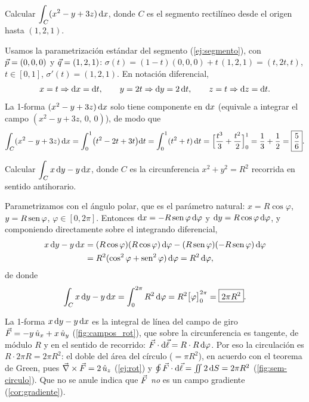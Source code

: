 \begin{ejercicio}\label{ejer:segmento}
Calcular $\displaystyle\int_C(x^{2}-y+3z)\,\mathrm{d} x$, donde $C$ es el segmento
rectilíneo desde el origen hasta $(1,2,1)$.
\end{ejercicio}
\begin{resolucion}
Usamos la parametrización estándar del segmento (\cref{ej:segmento}), con
$\vec{p}=(0,0,0)$ y $\vec{q}=(1,2,1)$:
$\sigma(t)=(1-t)(0,0,0)+t\,(1,2,1)=(t,2t,t)$, $t\in[0,1]$, $\sigma'(t)=(1,2,1)$.
En notación diferencial,
\[
  x=t\Rightarrow\mathrm{d} x=\mathrm{d} t,\qquad y=2t\Rightarrow\mathrm{d} y=2\,\mathrm{d} t,\qquad
  z=t\Rightarrow\mathrm{d} z=\mathrm{d} t .
\]
La 1-forma $(x^{2}-y+3z)\,\mathrm{d} x$ solo tiene componente en $\mathrm{d} x$ (equivale a
integrar el campo $(x^{2}-y+3z,\,0,\,0)$), de modo que
\[
  \int_C(x^{2}-y+3z)\,\mathrm{d} x=\int_{0}^{1}\bigl(t^{2}-2t+3t\bigr)\mathrm{d} t
  =\int_{0}^{1}(t^{2}+t)\,\mathrm{d} t=\Bigl[\frac{t^{3}}{3}+\frac{t^{2}}{2}\Bigr]_{0}^{1}
  =\frac13+\frac12=\boxed{\frac56}.
\]
\end{resolucion}

\begin{ejercicio}\label{ejer:circulo}
Calcular $\displaystyle\int_Cx\,\mathrm{d} y-y\,\mathrm{d} x$, donde $C$ es la circunferencia
$x^{2}+y^{2}=R^{2}$ recorrida en sentido antihorario.
\end{ejercicio}
\begin{resolucion}
Parametrizamos con el ángulo polar, que es el parámetro natural:
$x=R\cos\varphi$, $y=R\operatorname{sen}\varphi$, $\varphi\in[0,2\pi]$. Entonces
$\mathrm{d} x=-R\operatorname{sen}\varphi\,\mathrm{d}\varphi$ y $\mathrm{d} y=R\cos\varphi\,\mathrm{d}\varphi$, y componiendo
directamente sobre el integrando diferencial,
\begin{align*}
  x\,\mathrm{d} y-y\,\mathrm{d} x&=(R\cos\varphi)(R\cos\varphi)\,\mathrm{d}\varphi-(R\operatorname{sen}\varphi)(-R\operatorname{sen}\varphi)\,\mathrm{d}\varphi\\
  &=R^{2}(\cos^{2}\varphi+\operatorname{sen}^{2}\varphi)\,\mathrm{d}\varphi=R^{2}\,\mathrm{d}\varphi ,
\end{align*}
de donde
\[
  \int_Cx\,\mathrm{d} y-y\,\mathrm{d} x=\int_{0}^{2\pi}R^{2}\,\mathrm{d}\varphi=R^{2}\bigl[\varphi\bigr]_{0}^{2\pi}=\boxed{2\pi R^{2}} .
\]
\end{resolucion}

\begin{observacion}
La 1-forma $x\,\mathrm{d} y-y\,\mathrm{d} x$ es la integral de línea del campo de giro
$\vec{F}=-y\,\hat{u}_{x}+x\,\hat{u}_{y}$ (\cref{fig:campos_rot}), que sobre la circunferencia es
tangente, de módulo $R$ y en el sentido de recorrido: $\vec{F}\cdot\mathrm{d}\vec{\ell}=R\cdot R\,\mathrm{d}\varphi$.
Por eso la circulación es $R\cdot2\pi R=2\pi R^{2}$: el doble del área del círculo
($=\pi R^{2}$), en acuerdo con el teorema de Green, pues
$\vec{\nabla}\times\vec{F}=2\,\hat{u}_{z}$ (\cref{ej:rot}) y $\oint\vec{F}\cdot\mathrm{d}\vec{\ell}=\iint2\,\mathrm{d} S=2\pi R^{2}$
(\cref{fig:sem-circulo}). Que no se anule indica que $\vec{F}$ \emph{no} es un
campo gradiente (\cref{cor:gradiente}).
\end{observacion}

